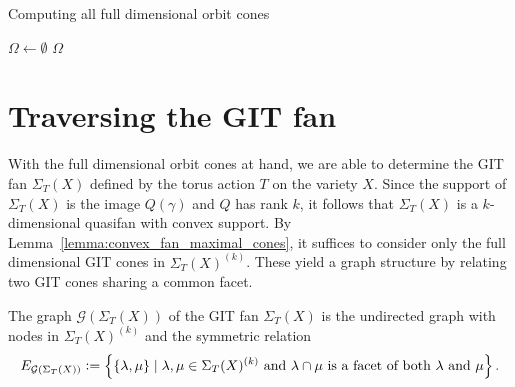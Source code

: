 \begin{algorithm}
	\caption{Computing all full dimensional orbit cones}
	\label{algo:compute_orbit_cones}
	
	\BlankLine
	$\Omega \leftarrow \emptyset$\;
	\Return $\Omega$\;
\end{algorithm}

\section{Traversing the GIT fan}

With the full dimensional orbit cones at hand, we are able to determine the GIT fan $\Sigma_T(X)$ defined by the torus action $T$ on the variety $X$. Since the support of $\Sigma_T(X)$ is the image $Q(\gamma)$ and $Q$ has rank $k$, it follows that $\Sigma_T(X)$ is a $k$-dimensional quasifan with convex support.
By Lemma~\ref{lemma:convex_fan_maximal_cones}, it suffices to consider only the full dimensional GIT cones in $\Sigma_T(X)^{(k)}$. These yield a graph structure by relating two GIT cones sharing a common facet.

\begin{defi}
	The graph $\mathcal{G}(\Sigma_T(X))$ of the GIT fan $\Sigma_T(X)$ is the undirected graph with nodes in $\Sigma_T(X)^{(k)}$ and the symmetric relation
	$$E_{\mathcal{G}(\Sigma_T(X))} \mathrel{\mathop:}= \left\{\{\lambda, \mu\} \mid \lambda, \mu \in \Sigma_T(X)^{(k)} \text{ and }\lambda \cap \mu \text{ is a facet of both }\lambda\text{ and }\mu\right\}.$$
\end{defi}

